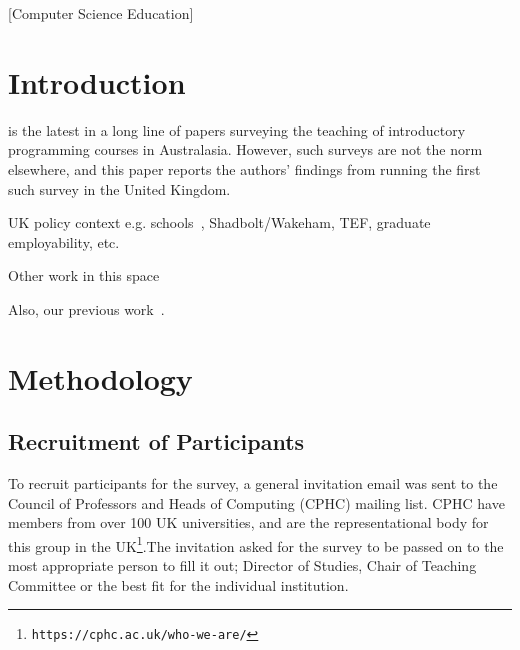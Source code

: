 \documentclass{sig-alternate}
\begin{document}
[Computer Science Education]

\section{Introduction}\label{intro}

\cite{mason+cooper:2014} is the latest in a long line \cite{deraadt-et-al:2004,mason-et-al:2012} of papers surveying the teaching of introductory programming courses in Australasia. However, such surveys are not the norm elsewhere, and this paper reports the authors' findings from running the first such survey in the United Kingdom.

UK policy context
e.g. schools~\cite{brown-et-al-sigcse2013,brown-et-al-toce2014},
Shadbolt/Wakeham, TEF, graduate employability, etc.

Other work in this
space~\cite{mccracken-et-al:2001,gupta:2004,dale:2006,pears-et-al:2007,guo:2014}

Also, our previous work~\cite{crick-et-al-hea:2015,davenport-et-al:latice2016}.


\section{Methodology}\label{method}
\subsection{Recruitment of Participants}

To recruit participants for the survey, a general invitation email was sent to the Council of Professors and Heads of Computing (CPHC) mailing list. CPHC have members from over 100 UK universities, and are the representational body for this group in the UK\footnote{\texttt{https://cphc.ac.uk/who-we-are/}}.The invitation asked for the survey to be passed on to the most appropriate person to fill it out; Director of Studies, Chair of Teaching Committee or the best fit for the individual institution.
\end{document}
